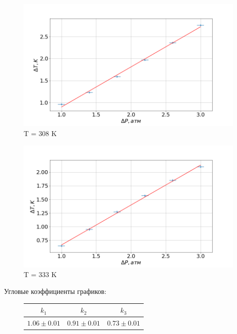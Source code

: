 \documentclass[a4paper, fontsize=14pt]{article}
\begin{document}
	\begin{figure}[H]
	\includegraphics[width = 1.0\linewidth]{308.png}
		\caption{T = 308 K}
	\end{figure}
	
	\begin{figure}[H]
	\includegraphics[width = 1.0\linewidth]{333.png}
		\caption{T = 333 K}
	\end{figure}
	
	Угловые коэффициенты графиков:
	\begin{figure}[H]
\center
\begin{tabular}{|c|c|c|}
\hline $k_1$ & $k_2$ & $k_3$ \\
\hline $1.06 \pm 0.01$ & $0.91 \pm 0.01$ & $0.73 \pm 0.01$ \\\hline
	\end{tabular}
\end{figure}
\end{document}
